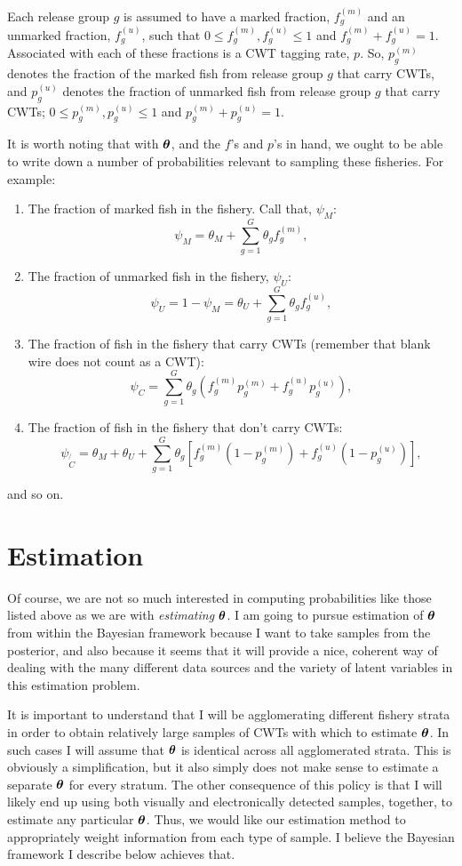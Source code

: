 \documentclass[11pt]{article}
\def\bm#1{\mathpalette\bmstyle{#1}}
\def\bmstyle#1#2{\mbox{\boldmath$#1#2$}}
\newcommand{\btheta}{\bm{\theta}}
\begin{document}
Each release group $g$ is assumed to have a marked fraction, $f^{(m)}_g$ and an unmarked fraction, $f^{(u)}_g$, 
such that $0 \leq f^{(m)}_g, f^{(u)}_g \leq 1$ and $f^{(m)}_g + f^{(u)}_g = 1$. Associated with each of these fractions is a CWT tagging rate, $p$.  So, $p^{(m)}_g$ denotes the
fraction of the marked fish from release group $g$ that carry CWTs, and $p^{(u)}_g$ denotes the fraction
of unmarked fish from release group $g$ that carry CWTs; $0 \leq p^{(m)}_g, p^{(u)}_g \leq 1$
and $p^{(m)}_g + p^{(u)}_g = 1$.

It is worth noting that with $\btheta$, and the $f$'s and $p$'s in hand, we ought to be able to
write down a number of probabilities relevant to sampling these fisheries.  For example:
\begin{enumerate}
\item The fraction of marked fish in the fishery.  Call that, $\psi_M$:
\[
\psi_M = \theta_M + \sum_{g=1}^G \theta_g f^{(m)}_g,
\]
\item The fraction of unmarked fish in the fishery, $\psi_U$:
\[
\psi_U = 1- \psi_M = \theta_U + \sum_{g=1}^G \theta_g f^{(u)}_g,
\]
\item The fraction of fish in the fishery that carry CWTs (remember that blank wire does not
count as a CWT):
\[
\psi_C = \sum_{g=1}^G \theta_g(f^{(m)}_g p^{(m)}_g + f^{(u)}_g p^{(u)}_g),
\]
\item The fraction of fish in the fishery that don't carry CWTs:
\[
\psi_{\not{C}} = \theta_M + \theta_U + \sum_{g=1}^G \theta_g[f^{(m)}_g (1 - p^{(m)}_g) + f^{(u)}_g (1-p^{(u)}_g)],
\]
\end{enumerate}
and so on. 

\section{Estimation}

Of course, we are not so much interested in computing probabilities like those listed above as we are 
with {\em estimating} $\btheta$.  I am going to pursue estimation of $\btheta$ from within the Bayesian
framework because I want to take samples from the posterior, and also because it seems that it will
provide a nice, coherent way of dealing with the many different data sources and the variety of 
latent variables in this estimation problem.

It is important to understand that I will be agglomerating different fishery strata in order to obtain
relatively large samples of CWTs with which to estimate $\btheta$.  In such cases I will assume that
$\btheta$ is identical across all agglomerated strata.  This is obviously a simplification, but it also
simply does not make sense to estimate a separate $\btheta$ for every stratum.  The other consequence
of this policy is that I will likely end up using both visually and electronically detected samples, together, to estimate any particular $\btheta$.  Thus, we would like our estimation method to
appropriately weight information from each type of sample.  I believe the Bayesian framework I
describe below achieves that.
\end{document}
